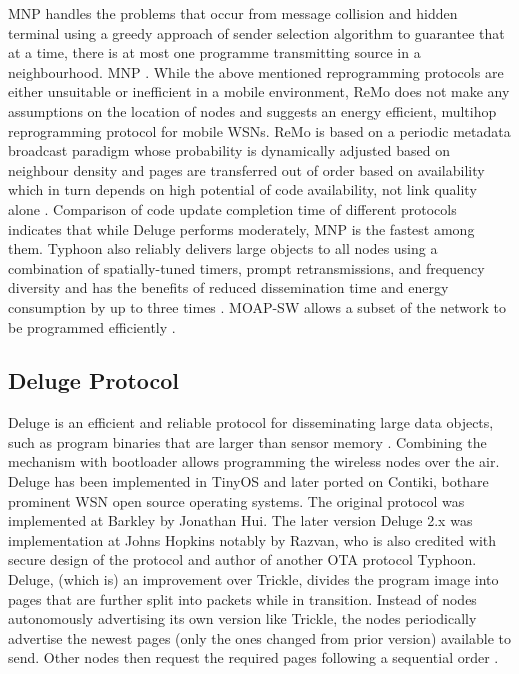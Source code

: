 \documentclass[conference,man]{IEEEtran}
\begin{document}
MNP handles the problems that occur from message collision and hidden terminal using a greedy approach of sender selection algorithm to guarantee that at a time, there is at most one programme transmitting source  in a neighbourhood. 
MNP  \cite{Kulkarni:2005:MMN:1068511.1069352}.
While the above mentioned reprogramming protocols  are either unsuitable or inefficient in a mobile environment, ReMo does not make any assumptions on the location of nodes and suggests an energy efficient, multihop reprogramming protocol for mobile WSNs.
ReMo is based on a periodic metadata broadcast paradigm whose probability is dynamically adjusted based on neighbour density and pages are transferred out of order based on availability which in turn depends on high potential of code availability, not link quality alone \cite{ISI:000271540300007}.
Comparison of code update completion time of different protocols indicates that while Deluge performs moderately, MNP is the fastest among them.
Typhoon also reliably delivers large objects to all nodes using a combination of spatially-tuned timers, prompt retransmissions, and frequency diversity  and has the benefits of reduced dissemination time and energy consumption by up to three times \cite{liang2008typhoon}.
MOAP-SW allows a subset of the network to be programmed efficiently \cite{Maia20131277}.


\subsection{Deluge Protocol}
Deluge is an efficient and reliable protocol for disseminating large data objects, such as program binaries that are larger than sensor memory \cite{1031506}. 
Combining the mechanism with bootloader  allows programming the wireless nodes over the air.
Deluge has been implemented in TinyOS and later ported on Contiki, bothare prominent WSN open source operating systems.
The original protocol was implemented at Barkley by Jonathan Hui. %
The later version Deluge 2.x was implementation at Johns Hopkins notably by Razvan, who is also credited with secure design of the protocol and author of another OTA protocol Typhoon. %
Deluge, (which is) an improvement over Trickle,  divides the program image into pages that are further split into packets while in transition. 
Instead of nodes autonomously advertising its own version like Trickle, the nodes periodically advertise the newest pages (only the ones changed from prior version) available to send. 
Other nodes then request the required pages following a sequential order \cite{1031506}.
\end{document}
